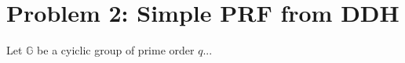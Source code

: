 \section{Problem 2: Simple PRF from DDH}\label{sec:problem2}

Let $\mathbb{G}$ be a cyiclic group of prime order $q$...
